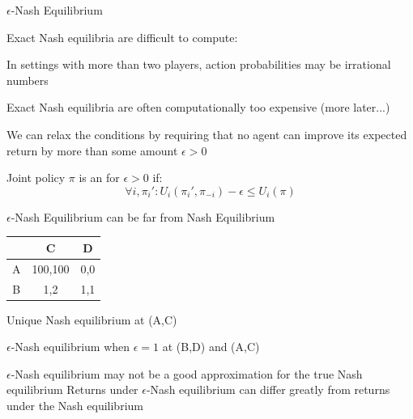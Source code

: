     

\begin{frame}{\(\epsilon\)-Nash Equilibrium}

    Exact Nash equilibria are difficult to compute: 

    \blist
        \item In settings with more than two players, action probabilities may be irrational numbers
        \item Exact Nash equilibria are often computationally too expensive (more later...)
        \item We can relax the conditions by requiring that no agent can improve its expected return by more than some amount $\epsilon > 0$
    \elist
    
    Joint policy $\pi$ is an  for $\epsilon > 0$ if:
    \begin{equation*}
        \forall i, \pi_{i}': U_{i}(\pi_{i}', \pi_{-i})-\epsilon \le U_i(\pi)
    \end{equation*}

\end{frame}

\begin{frame}{$\epsilon$-Nash Equilibrium can be far from Nash Equilibrium}

    \centering
    \begin{tabular}[b]{c|c|c}
    & C & D \\
    \hline
    A & 100,100 & 0,0 \\
    \hline
    B & 1,2 & 1,1 \\
    \end{tabular}
    \vspace{10pt}
    
    \blist
        \item Unique Nash equilibrium at (A,C)
        \item \(\epsilon\)-Nash equilibrium when \(\epsilon = 1\) at (B,D) and (A,C)
        \item \(\epsilon\)-Nash equilibrium may not be a good approximation for the true Nash equilibrium
        \listtab Returns under $\epsilon$-Nash equilibrium can differ greatly from returns under the Nash equilibrium
    \elist
\end{frame}

